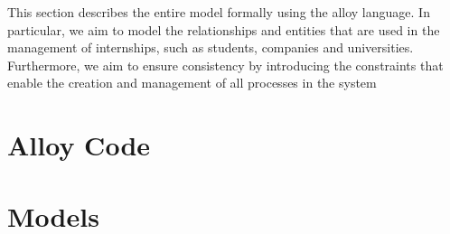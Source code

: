 This section describes the entire model formally using the alloy language.
In particular, we aim to model the relationships and entities that are used in the management of internships, such as students, companies and universities. Furthermore, we aim to ensure consistency by introducing the constraints that enable the creation and management of all processes in the system


\section{Alloy Code}



\pagebreak
\section{Models}